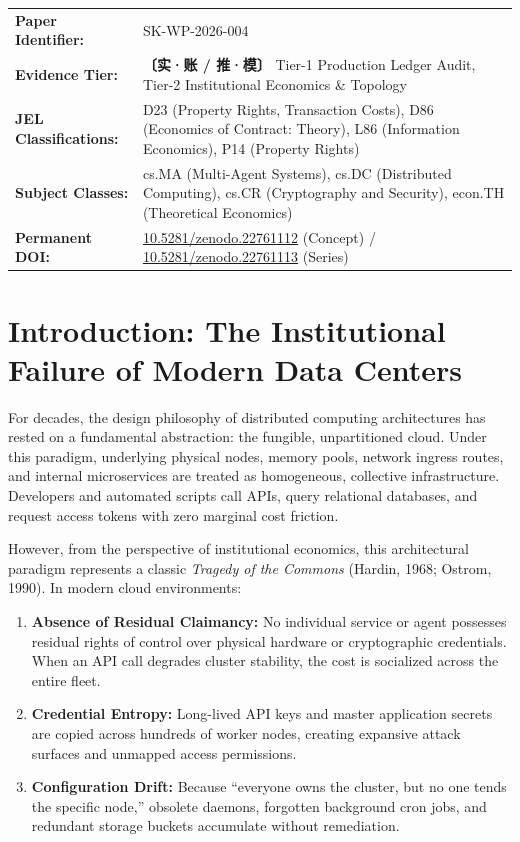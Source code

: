 \documentclass[11pt,a4paper]{article}
\begin{document}
\vspace{1em}
\begin{center}
\small
\begin{tabular}{ll}
\toprule
\textbf{Paper Identifier:} & SK-WP-2026-004 \\
\textbf{Evidence Tier:} & \textbf{〔实·账 / 推·模〕} Tier-1 Production Ledger Audit, Tier-2 Institutional Economics \& Topology \\
\textbf{JEL Classifications:} & D23 (Property Rights, Transaction Costs), D86 (Economics of Contract: Theory), L86 (Information Economics), P14 (Property Rights) \\
\textbf{Subject Classes:} & cs.MA (Multi-Agent Systems), cs.DC (Distributed Computing), cs.CR (Cryptography and Security), econ.TH (Theoretical Economics) \\
\textbf{Permanent DOI:} & \href{https://doi.org/10.5281/zenodo.22761112}{10.5281/zenodo.22761112} (Concept) / \href{https://doi.org/10.5281/zenodo.22761113}{10.5281/zenodo.22761113} (Series) \\
\bottomrule
\end{tabular}
\end{center}

\newpage

\section{Introduction: The Institutional Failure of Modern Data Centers}

For decades, the design philosophy of distributed computing architectures has rested on a fundamental abstraction: the fungible, unpartitioned cloud. Under this paradigm, underlying physical nodes, memory pools, network ingress routes, and internal microservices are treated as homogeneous, collective infrastructure. Developers and automated scripts call APIs, query relational databases, and request access tokens with zero marginal cost friction.

However, from the perspective of institutional economics, this architectural paradigm represents a classic \textit{Tragedy of the Commons} (Hardin, 1968; Ostrom, 1990). In modern cloud environments:
\begin{enumerate}
    \item \textbf{Absence of Residual Claimancy:} No individual service or agent possesses residual rights of control over physical hardware or cryptographic credentials. When an API call degrades cluster stability, the cost is socialized across the entire fleet.
    \item \textbf{Credential Entropy:} Long-lived API keys and master application secrets are copied across hundreds of worker nodes, creating expansive attack surfaces and unmapped access permissions.
    \item \textbf{Configuration Drift:} Because ``everyone owns the cluster, but no one tends the specific node,'' obsolete daemons, forgotten background cron jobs, and redundant storage buckets accumulate without remediation.
\end{enumerate}
\end{document}
